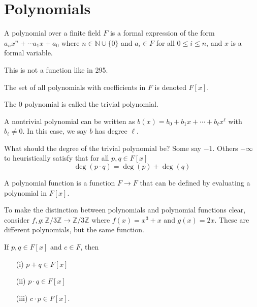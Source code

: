 \section{Polynomials}
\begin{definition}[Polynomial]
	A polynomial over a finite field \(F\) is a formal expression of the form \(a_n x^n + \cdots a_1 x + a_0\) where \(n \in \mathbb{N} \cup \{ 0 \} \) and \(a_i \in F\) for all \(0 \leq i \leq n\), and \(x \) is a formal variable.
    \begin{note}
        This is not a function like in 295.
    \end{note}
\end{definition}
\begin{definition}
	The set of all polynomials with coefficients in \(F\) is denoted \(F[x]\).
\end{definition}
\begin{definition}
	The 0 polynomial is called the trivial polynomial.
\end{definition}
\begin{definition}
	A nontrivial polynomial can be written as \(b(x) = b_0 + b_1 x + \cdots +  b_{\ell }  x^{\ell } \) with \(b_{\ell} \neq 0 \). In this case, we say \(b\) has degree \(\ell \).
	\begin{remark}
		What should the degree of the trivial polynomial be? Some say \(-1\). Others \(-\infty \) to heuristically satisfy that for all \(p,q \in F[x]\)
		\[
			\deg(p\cdot q) = \deg(p) + \deg(q)
		\]
	\end{remark}
\end{definition}
\begin{definition}
    A polynomial function is a function \(F \to F\) that can be defined by evaluating a polynomial in \(F[x]\).  
\end{definition}
\begin{eg}
    To make the distinction between polynomials and polynomial functions clear, consider \(f,g \colon \mathbb{Z} /3\mathbb{Z} \to \mathbb{Z} /3\mathbb{Z} \) where \(f(x)=x^3 + x\) and \(g(x)=2x\). These are different polynomials, but the same function.
\end{eg}
\begin{lemma}
    If \(p,q \in F[x]\) and \(c \in F\), then
    \begin{itemize}
        \item[(i)] \(p+q \in F[x]\)
        \item[(ii)] \(p\cdot q \in F[x]\)
        \item[(iii)] \(c \cdot p \in F[x]\).
    \end{itemize}  
\end{lemma}
